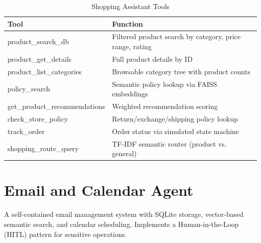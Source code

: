 \documentclass[12pt,a4paper,twoside]{report}
\begin{document}
\begin{table}[H]
\centering
{}
\begin{tabularx}{\textwidth}{|l|X|}
\hline
\rowcolor{phiblue!20}
\textbf{Tool} & \textbf{Function} \\
\hline
product\_search\_db & Filtered product search by category, price range, rating \\
\hline
product\_get\_details & Full product details by ID \\
\hline
product\_list\_categories & Browsable category tree with product counts \\
\hline
policy\_search & Semantic policy lookup via FAISS embeddings \\
\hline
get\_product\_recommendations & Weighted recommendation scoring \\
\hline
check\_store\_policy & Return/exchange/shipping policy lookup \\
\hline
track\_order & Order status via simulated state machine \\
\hline
shopping\_route\_query & TF-IDF semantic router (product vs. general) \\
\hline
\end{tabularx}
\caption{Shopping Assistant Tools}
\end{table}

\section{Email and Calendar Agent}

A self-contained email management system with SQLite storage, vector-based semantic search, and calendar scheduling. Implements a Human-in-the-Loop (HITL) pattern for sensitive operations.
\end{document}
